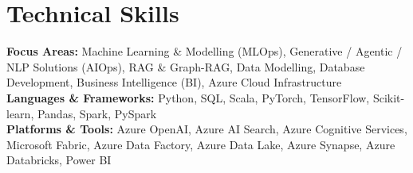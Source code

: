 \documentclass[letterpaper,11pt]{article}
\begin{document}
\section{Technical Skills}
\begin{itemize}[leftmargin=0.15in, label={}]
  \small{\item{
    \textbf{Focus Areas:} Machine Learning \& Modelling (MLOps), Generative / Agentic /
    NLP Solutions (AIOps), RAG \& Graph-RAG, Data Modelling, Database Development,
    Business Intelligence (BI), Azure Cloud Infrastructure \\ \vspace{2pt}
    \textbf{Languages \& Frameworks:} Python, SQL, Scala, PyTorch, TensorFlow, Scikit-learn, Pandas, Spark, PySpark \\ \vspace{2pt}
    \textbf{Platforms \& Tools:} Azure OpenAI, Azure AI Search, Azure Cognitive Services,
    Microsoft Fabric, Azure Data Factory, Azure Data Lake,
    Azure Synapse, Azure Databricks, Power BI
  }}
\end{itemize}

\end{document}
